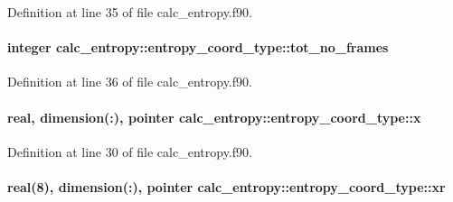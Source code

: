 Definition at line 35 of file calc\-\_\-entropy.\-f90.

\hypertarget{structcalc__entropy_1_1entropy__coord__type_a7f44c31e1db1462eff29570c5947c077}{
\paragraph[{tot\-\_\-no\-\_\-frames}]{\setlength{\rightskip}{0pt plus 5cm}integer calc\-\_\-entropy\-::entropy\-\_\-coord\-\_\-type\-::tot\-\_\-no\-\_\-frames}}\label{structcalc__entropy_1_1entropy__coord__type_a7f44c31e1db1462eff29570c5947c077}


Definition at line 36 of file calc\-\_\-entropy.\-f90.

\hypertarget{structcalc__entropy_1_1entropy__coord__type_a283c623301accb22a8f951c05369478d}{
\paragraph[{x}]{\setlength{\rightskip}{0pt plus 5cm}real, dimension(\-:), pointer calc\-\_\-entropy\-::entropy\-\_\-coord\-\_\-type\-::x}}\label{structcalc__entropy_1_1entropy__coord__type_a283c623301accb22a8f951c05369478d}


Definition at line 30 of file calc\-\_\-entropy.\-f90.

\hypertarget{structcalc__entropy_1_1entropy__coord__type_ac85be6a3407782edbf5483783e7610fd}{
\paragraph[{xr}]{\setlength{\rightskip}{0pt plus 5cm}real(8), dimension(\-:), pointer calc\-\_\-entropy\-::entropy\-\_\-coord\-\_\-type\-::xr}}\label{structcalc__entropy_1_1entropy__coord__type_ac85be6a3407782edbf5483783e7610fd}


